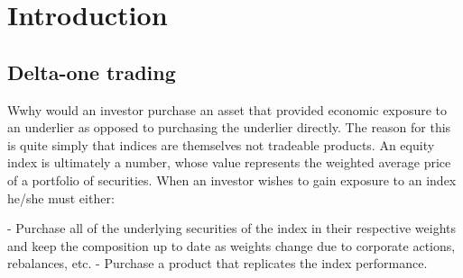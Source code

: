 \chapter{Introduction}







\section{Delta-one trading}
Wwhy would an investor purchase an asset that provided economic exposure to an underlier as opposed to purchasing the underlier directly. The reason for this is quite simply that indices are themselves not tradeable products. An equity index is ultimately a number, whose value represents the weighted average price of a portfolio of securities. When an investor wishes to gain exposure to an index he/she must either:

- Purchase all of the underlying securities of the index in their respective weights and keep the composition up to date as weights change due to corporate actions, rebalances, etc.
- Purchase a product that replicates the index performance.

